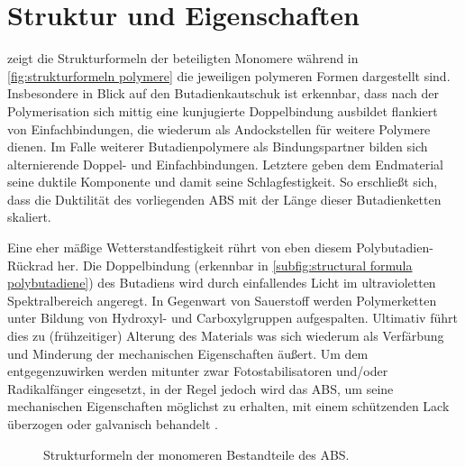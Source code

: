     \section{Struktur und Eigenschaften}
             zeigt die Strukturformeln der beteiligten Monomere während in \cref{fig:strukturformeln polymere}
            die jeweiligen polymeren Formen dargestellt sind. Insbesondere in Blick auf den Butadienkautschuk ist erkennbar,
            dass nach der Polymerisation sich mittig eine kunjugierte Doppelbindung ausbildet flankiert von Einfachbindungen,
            die wiederum als Andockstellen für weitere Polymere dienen. Im Falle weiterer Butadienpolymere als Bindungspartner
            bilden sich alternierende Doppel- und Einfachbindungen. Letztere geben dem Endmaterial seine duktile Komponente und
            damit seine Schlagfestigkeit. So erschließt sich, dass die Duktilität des vorliegenden ABS mit der Länge
            dieser Butadienketten skaliert.\par
            Eine eher mäßige Wetterstandfestigkeit rührt von eben diesem Polybutadien-Rückrad her. Die Doppelbindung (erkennbar
            in \cref{subfig:structural formula polybutadiene}) des
            Butadiens wird durch einfallendes Licht im ultravioletten Spektralbereich angeregt. In Gegenwart von Sauerstoff
            werden Polymerketten unter Bildung von Hydroxyl- und Carboxylgruppen aufgespalten. Ultimativ führt dies zu
            (frühzeitiger) Alterung des Materials was sich wiederum als Verfärbung und Minderung der mechanischen Eigenschaften äußert.
            Um dem entgegenzuwirken werden mitunter zwar Fotostabilisatoren und/oder Radikalfänger eingesetzt, in der 
            Regel jedoch wird das ABS, um seine mechanischen Eigenschaften möglichst zu erhalten, mit einem schützenden Lack
            überzogen oder galvanisch behandelt \cite{Thermal.and.Photo-Degradation.of.Unstabilized.ABS.Adeniyi.1984,Domininghaus.1998.Kunststoffe.und.ihre.Eigenschaften}.
            \begin{figure}[H]%
                \centering
                \qquad
                \qquad
                \caption[Strukturformeln der monomeren Bestandteile des ABS]{Strukturformeln der monomeren Bestandteile des ABS.}%
                \label{fig:strukturformeln_monomere}%
            \end{figure}
